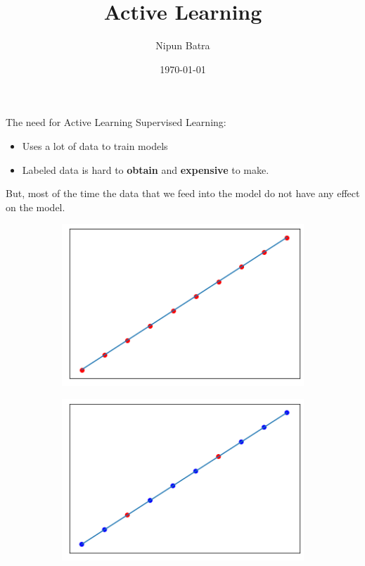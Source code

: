 \documentclass{beamer}
\title{Active Learning}
\date{\today}
\author{Nipun Batra}
\institute{IIT Gandhinagar}
\begin{document}
  \maketitle

\begin{frame}{The need for Active Learning}
\vspace{1cm}
Supervised Learning:
\begin{itemize}
\item Uses a lot of data to train models
\item Labeled data is hard to \textbf{obtain} and \textbf{expensive} to make.
\end{itemize}
\pause
But, most of the time the data that we feed into the model do not have any effect on the model.
\begin{figure}
        \begin{subfigure}[b]{0.5\textwidth}
                \includegraphics[width=\linewidth]{active/in_1.png}
        \end{subfigure}%
        \begin{subfigure}[b]{0.5\textwidth}
                \includegraphics[width=\linewidth]{active/in_2.png}
        \end{subfigure}%
\end{figure}
\end{frame}
\end{document}
